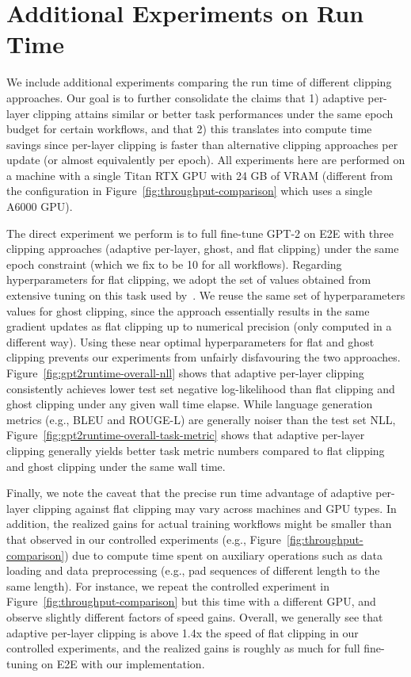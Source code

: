 \clearpage
\newpage
\section{Additional Experiments on Run Time}
\label{app:runtime}

We include additional experiments comparing the run time of different clipping approaches.
Our goal is to further consolidate the claims that 1) adaptive per-layer clipping attains similar or better task performances under the same epoch budget for certain workflows, and that 2) this translates into compute time savings since per-layer clipping is faster than alternative clipping approaches per update (or almost equivalently per epoch).
All experiments here are performed on a machine with a single Titan RTX GPU with 24 GB of VRAM (different from the configuration in Figure~\ref{fig:throughput-comparison} which uses a single A6000 GPU).

The direct experiment we perform is to full fine-tune GPT-2 on E2E with three clipping approaches (adaptive per-layer, ghost, and flat clipping) under the same epoch constraint (which we fix to be 10 for all workflows).
Regarding hyperparameters for flat clipping, we adopt the set of values obtained from extensive tuning on this task used by~\cite{li2022large}.
We reuse the same set of hyperparameters values for ghost clipping, since the approach essentially results in the same gradient updates as flat clipping up to numerical precision (only computed in a different way).
Using these near optimal hyperparameters for flat and ghost clipping prevents our experiments from unfairly disfavouring the two approaches.
Figure~\ref{fig:gpt2runtime-overall-nll} shows that adaptive per-layer clipping consistently achieves lower test set negative log-likelihood than flat clipping and ghost clipping under any given wall time elapse.
While language generation metrics (e.g., BLEU and ROUGE-L) are generally noiser than the test set NLL, Figure~\ref{fig:gpt2runtime-overall-task-metric} shows that adaptive per-layer clipping generally yields better task metric numbers compared to flat clipping and ghost clipping under the same wall time.

Finally, we note the caveat that the precise run time advantage of adaptive per-layer clipping against flat clipping may vary across machines and GPU types.
In addition, the realized gains for actual training workflows might be smaller than that observed in our controlled experiments (e.g., Figure~\ref{fig:throughput-comparison}) due to compute time spent on auxiliary operations such as data loading and data preprocessing (e.g., pad sequences of different length to the same length). 
For instance, we repeat the controlled experiment in Figure~\ref{fig:throughput-comparison} but this time with a different GPU, and observe slightly different factors of speed gains. 
Overall, we generally see that adaptive per-layer clipping is above 1.4x the speed of flat clipping in our controlled experiments, and the realized gains is roughly as much for full fine-tuning on E2E with our implementation.

